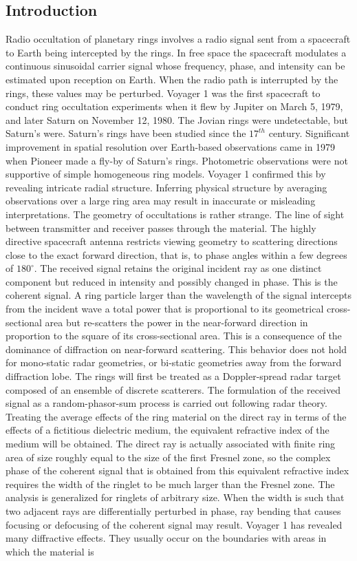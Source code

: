 \documentclass{article}
\theoremstyle{mystyle}
\begin{document}
\subsection{Introduction}
\noindent Radio occultation of planetary rings involves a radio signal sent from a spacecraft to Earth being intercepted by the rings. In free space the spacecraft modulates a continuous sinusoidal carrier signal whose frequency, phase, and intensity can be estimated upon reception on Earth. When the radio path is interrupted by the rings, these values may be perturbed. Voyager 1 was the first spacecraft to conduct ring occultation experiments when it flew by Jupiter on March 5, 1979, and later Saturn on November 12, 1980. The Jovian rings were undetectable, but Saturn's were. Saturn's rings have been studied since the $17^{th}$ century. Significant improvement in spatial resolution over Earth-based observations came in 1979 when Pioneer made a fly-by of Saturn's rings. Photometric observations were not supportive of simple homogeneous ring models. Voyager 1 confirmed this by revealing intricate radial structure. Inferring physical structure by averaging observations over a large ring area may result in inaccurate or misleading interpretations. The geometry of occultations is rather strange. The line of sight between transmitter and receiver passes through the material. The highly directive spacecraft antenna restricts viewing geometry to scattering directions close to the exact forward direction, that is, to phase angles within a few degrees of $180^{\circ}$. The received signal retains the original incident ray as one distinct component but reduced in intensity and possibly changed in phase. This is the coherent signal. A ring particle larger than the wavelength of the signal intercepts from the incident wave a total power that is proportional to its geometrical cross-sectional area but re-scatters the power in the near-forward direction in proportion to the square of its cross-sectional area. This is a consequence of the dominance of diffraction on near-forward scattering. This behavior does not hold for mono-static radar geometries, or bi-static geometries away from the forward diffraction lobe. The rings will first be treated as a Doppler-spread radar target composed of an ensemble of discrete scatterers. The formulation of the received signal as a random-phasor-sum process is carried out following radar theory. Treating the average effects of the ring material on the direct ray in terms of the effects of a fictitious dielectric medium, the equivalent refractive index of the medium will be obtained. The direct ray is actually associated with finite ring area of size roughly equal to the size of the first Fresnel zone, so the complex phase of the coherent signal that is obtained from this equivalent refractive index requires the width of the ringlet to be much larger than the Fresnel zone. The analysis is generalized for ringlets of arbitrary size. When the width is such that two adjacent rays are differentially perturbed in phase, ray bending that causes focusing or defocusing of the coherent signal may result. Voyager 1 has revealed many diffractive effects. They usually occur on the boundaries with areas in which the material is 
\end{document}
